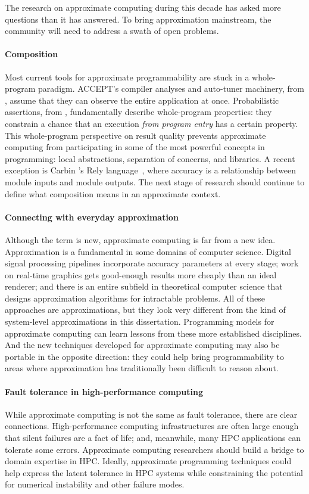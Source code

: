The research on approximate computing during this decade
has asked more questions than it has answered.
To bring approximation mainstream, the community will need to address a swath
of open problems.

\paragraph{Composition}
Most current tools for approximate programmability are stuck in a
whole-program paradigm.
ACCEPT's compiler analyses and auto-tuner machinery, from ,
assume that they can observe the entire application at once.
Probabilistic assertions, from ,
fundamentally describe whole-program properties: they constrain a chance that
an execution \emph{from program entry} has a certain property.
This whole-program perspective on result quality prevents approximate
computing from participating in some of the most powerful concepts in
programming: local abstractions, separation of concerns, and libraries.
A recent exception is Carbin \etal's Rely language~\cite{rely},
where accuracy is a relationship between module inputs and module outputs.
The next stage of research should continue to define what composition means in
an approximate context.

\paragraph{Connecting with everyday approximation}
Although the term is new, approximate computing is far from a new idea.
Approximation is a fundamental in some domains of computer science.
Digital signal processing pipelines incorporate accuracy parameters at every
stage;
work on real-time graphics gets good-enough results more cheaply than an ideal
renderer;
and there is an entire subfield in theoretical computer science that designs
approximation algorithms for intractable problems.
All of these approaches are approximations, but they look very different from
the kind of system-level approximations in this dissertation.
Programming models for approximate computing can learn lessons from these more
established disciplines.
And the new techniques developed for approximate computing may also be
portable in the opposite direction:
they could help bring programmability to areas where approximation has
traditionally been difficult to reason about.

\paragraph{Fault tolerance in high-performance computing}
While approximate computing is not the same as fault tolerance, there are
clear connections.
High-performance computing infrastructures are often large enough that silent
failures are a fact of life;
and, meanwhile, many HPC applications can tolerate some errors.
Approximate computing researchers should build a bridge to domain expertise in
HPC\@.
Ideally, approximate programming techniques could help
express the latent tolerance in
HPC systems while constraining the potential for numerical instability and
other failure modes.

